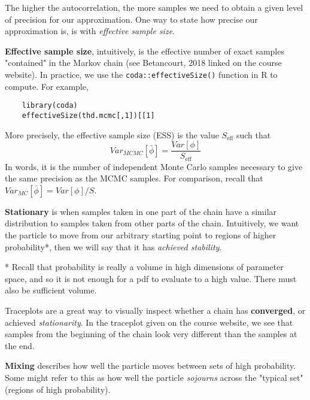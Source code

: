 \documentclass[titlepage, 12pt, leqno]{article}
\begin{document}
The higher the autocorrelation, the more samples we need to obtain a given
level of precision for our approximation. One way to state how precise our 
approximation is, is with \textit{effective sample size}.

\begin{definition}
    \textbf{Effective sample size}, intuitively, is the effective number of
    exact samples "contained" in the Markov chain (see Betancourt, 2018 linked
    on the course website). In practice, we use the 
    \texttt{coda::effectiveSize()} function in R to compute. For example,

    \begin{verbatim}
    library(coda)
    effectiveSize(thd.mcmc[,1])[[1]
    \end{verbatim}
\end{definition}

More precisely, the effective sample size (ESS) is the value $S_{ \text{eff}}$
such that
\[
    Var_{MCMC}[\bar \phi] = \frac{Var[\phi]}{S_{ \text{eff}}}
\]
In words, it is the number of independent Monte Carlo samples necessary to give
the same precision as the MCMC samples. For comparison, recall that
$Var_{MC}[\bar \phi] = Var[\phi]/S$.

\begin{definition}
    \textbf{Stationary} is when samples taken in one part of the chain have a
    similar distribution to samples taken from other parts of the chain.
    Intuitively, we want the particle to move from our arbitrary starting point
    to regions of higher probability*, then we will say that it has 
    \textit{achieved stability}.
    \begin{note}
        * Recall that probability is really a volume in high dimensions of
        parameter space, and so it is not enough for a pdf to evaluate to a
        high value. There must also be sufficient volume.
    \end{note}
\end{definition}

Traceplots are a great way to visually inspect whether a chain has
\textbf{converged}, or achieved \textit{stationarity}. In the traceplot given
on the course website, we see that samples from the beginning of the chain look
very different than the samples at the end.

\begin{definition}
    \textbf{Mixing} describes how well the particle moves between sets of
    high probability. Some might refer to this as how well the particle
    \textit{sojourns} across the "typical set" (regions of high probability).
\end{definition}
\end{document}
